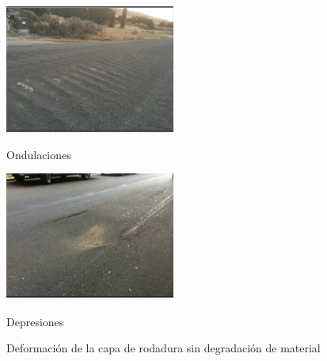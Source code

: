 \begin{figure}[ht!]
\begin{minipage}{0.3\linewidth}
		\includegraphics[width=\linewidth]{figs/ond.png}
		\caption*{\centering Ondulaciones }
	\end{minipage}
	\hspace{0.5 cm}
	\begin{minipage}{0.3\linewidth}
		\centering
		\includegraphics[width=\linewidth]{figs/dep.png}
		\caption*{\centering Depresiones}
	\end{minipage}
	
	
	\caption{Deformación de la capa de rodadura sin degradación de material}
	\label{fig:deformacion}
\end{figure}


